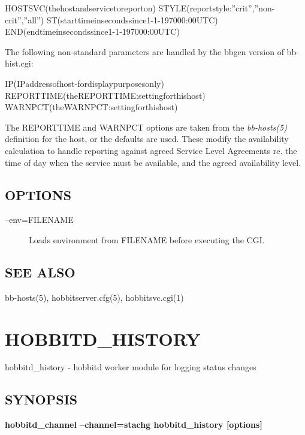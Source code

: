   
HOSTSVC(thehostandservicetoreporton)  
STYLE(reportstyle:''crit'',''non-crit'',''all'')  
ST(starttimeinsecondssince1-1-197000:00UTC)  
END(endtimeinsecondssince1-1-197000:00UTC) 


  The following non-standard parameters are handled by the bbgen version of bb-hist.cgi: 


  
IP(IPaddressofhost-fordisplaypurposesonly)  
REPORTTIME(theREPORTTIME:settingforthishost)  
WARNPCT(theWARNPCT:settingforthishost) 


  The REPORTTIME and WARNPCT options are taken from the
  \emph{bb-hosts(5)} definition for the host, or the defaults are
  used. These modify the availability calculation to handle reporting
  against agreed Service Level Agreements re. the time of day when the
  service must be available, and the agreed availability level. 



 
\subsection{OPTIONS}
\begin{description}
\item[--env=FILENAME] Loads environment from FILENAME before executing the CGI. 

 


\end{description}
\subsection{SEE ALSO}
bb-hosts(5), hobbitserver.cfg(5), hobbitsvc.cgi(1) 

 
  
%
\newpage
\section{HOBBITD\_HISTORY}

 hobbitd\_history - hobbitd worker module for logging status changes

 \subsection{SYNOPSIS}
\textbf{hobbitd\_channel --channel=stachg hobbitd\_history [options]}


